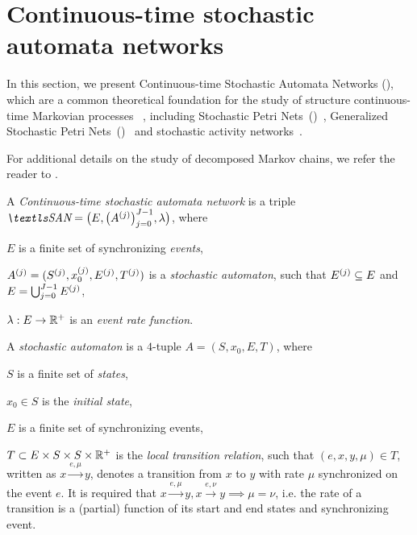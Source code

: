 \section{Continuous-time stochastic automata networks}

In this section, we present Continuous-time Stochastic Automata
Networks (), which are a common theoretical foundation for
the study of structure continuous-time Markovian processes%
~\citep{DBLP:journals/questa/Buchholz94,gusak2003lumpable}, including
Stochastic Petri Nets~()~\citep{DBLP:conf/apn/Marsan88},
Generalized Stochastic Petri
Nets~()~\citep{DBLP:journals/tse/Buchholz99} and
stochastic activity networks~\citep{DBLP:conf/pnpm/MeyerMS85}.

For additional details on the study of decomposed Markov chains, we
refer the reader to \citet{dayar2012analyzing}.

\begin{dfn}
  A \emph{Continuous-time stochastic automata network} is a triple
  $\SAN = \bigl(E, \bigl( \loc{A}{j} \bigr)_{j = 0}^{J - 1},
  \lambda\bigr)$, where
  \begin{asparaitem}
  \item $E$ is a finite set of synchronizing \emph{events},
  \item $A^{(j)} = (S^{(j)}, x_0^{(j)}, E^{(j)},
    T^{(j)})$ is a \emph{stochastic automaton}, such that
    $E^{(j)} \subseteq E$ and $E = \bigcup_{j = 0}^{J - 1}
    E^{(j)}$,
  \item $\lambda: E \to \mathbb{R}^{+}$ is an \emph{event rate function}.
  \end{asparaitem}
\end{dfn}

\begin{dfn}
  A \emph{stochastic automaton} is a $4$-tuple
  $A = (S, x_0, E, T)$, where
  \begin{asparaitem}
  \item $S$ is a finite set of \emph{states},
  \item $x_0 \in S$ is the \emph{initial state},
  \item $E$ is a finite set of synchronizing events,
  \item $T \subset E \times S \times S \times \mathbb{R}^{+}$ is the
    \emph{local transition relation}, such that
    $(e, x, y, \mu) \in T$, written as $x \xrightarrow{e, \mu} y$,
    denotes a transition from $x$ to $y$ with rate $\mu$ synchronized
    on the event $e$. It is required that $x \xrightarrow{e, \mu} y, x
    \xrightarrow{e, \nu} y \implies \mu = \nu$, i.e. the rate of a
    transition is a (partial) function of its start and end states and
    synchronizing event.
  \end{asparaitem}
\end{dfn}

